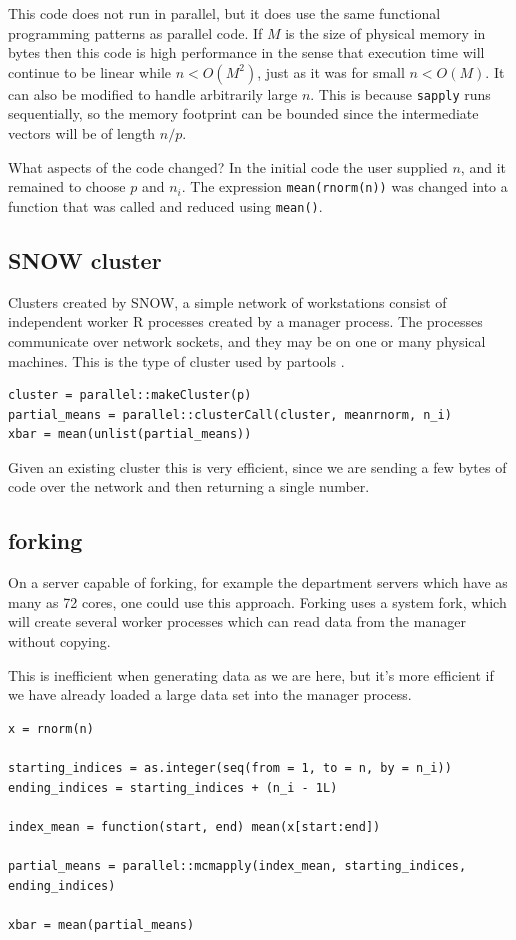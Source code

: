 \documentclass[12pt]{article}
\begin{document}
This code does not run in parallel, but it does use the same functional
programming patterns as parallel code. If $M$ is the size of physical memory in
bytes then this code is high performance in the sense
that execution time will continue to be linear while $n < O(M^2)$, just
as it was for small $n < O(M)$. It can also be modified to handle
arbitrarily large $n$. This is because \texttt{sapply} runs
sequentially, so the memory footprint can be bounded since the intermediate
vectors will be of length $n / p$. 

What aspects of the code changed? In the initial code the user
supplied $n$, and it remained to choose $p$ and $n_i$.
The expression \texttt{mean(rnorm(n))} was changed into a function that was
called and reduced using \texttt{mean()}.

\subsection{SNOW cluster}

Clusters created by SNOW, a simple network of workstations consist of independent
worker R processes created by a manager process. The processes communicate
over network sockets, and they may be on one or many physical machines.
This is the type of cluster used by partools \cite{R-partools}.

\begin{verbatim}
cluster = parallel::makeCluster(p)
partial_means = parallel::clusterCall(cluster, meanrnorm, n_i)
xbar = mean(unlist(partial_means))
\end{verbatim}

Given an existing cluster this is very efficient, since we are sending a
few bytes of code over the network and then returning a single number.

\subsection{forking}

On a server capable of forking, for example the department servers which
have as many as 72 cores, one could use this approach. Forking uses a
system fork, which will create several worker processes which can read data from
the manager without copying.

This is inefficient when generating data as we are here, but it's more
efficient if we have already loaded a large data set into the manager
process.

\begin{verbatim}
x = rnorm(n)

starting_indices = as.integer(seq(from = 1, to = n, by = n_i))
ending_indices = starting_indices + (n_i - 1L)

index_mean = function(start, end) mean(x[start:end])

partial_means = parallel::mcmapply(index_mean, starting_indices, ending_indices)

xbar = mean(partial_means)
\end{verbatim}
\end{document}
